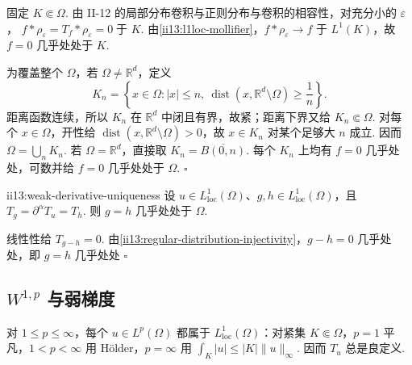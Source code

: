 \begin{FAProof}
固定 \(\displaystyle K\Subset\Omega\). 由 II-12 的局部分布卷积与正则分布与卷积的相容性，对充分小的 \(\displaystyle\varepsilon\)， \(\displaystyle f*\rho_\varepsilon = T_f*\rho_\varepsilon = 0 \;\text{于 }K.\)
由\autoref{ii13:l1loc-mollifier}，\(\displaystyle f*\rho_\varepsilon\to f\) 于 \(\displaystyle L^1(K)\)，故 \(\displaystyle f=0\) 几乎处处于 \(\displaystyle K\).

为覆盖整个 \(\displaystyle\Omega\)，若 \(\displaystyle\Omega\neq\mathbb R^d\)，定义
\[
K_n
=
\left\{x\in\Omega:
|x|\leqslant n,\ 
\operatorname{dist}(x,\mathbb R^d\setminus\Omega)\geqslant\frac1n
\right\}.
\]
距离函数连续，所以 \(\displaystyle K_n\) 在 \(\displaystyle\mathbb R^d\) 中闭且有界，故紧；距离下界又给 \(\displaystyle K_n\Subset\Omega\). 对每个 \(\displaystyle x\in\Omega\)，开性给 \(\displaystyle\operatorname{dist}(x,\mathbb R^d\setminus\Omega)>0\)，故 \(\displaystyle x\in K_n\) 对某个足够大 \(\displaystyle n\) 成立. 因而 \(\displaystyle\Omega=\bigcup_nK_n\). 若 \(\displaystyle\Omega=\mathbb R^d\)，直接取 \(\displaystyle K_n=\overline{B(0,n)}\). 每个 \(\displaystyle K_n\) 上均有 \(\displaystyle f=0\) 几乎处处，可数并给 \(\displaystyle f=0\) 几乎处处于 \(\displaystyle\Omega\).
\hfill\(\square\)
\end{FAProof}

\begin{FACorollary}[B][弱导数代表元唯一性]{ii13:weak-derivative-uniqueness}
设 \(\displaystyle u\in L^1_{\mathrm{loc}}(\Omega)\)、\(\displaystyle g,h\in L^1_{\mathrm{loc}}(\Omega)\)，且 \(\displaystyle T_g=\partial^\alpha T_u=T_h\). 则 \(\displaystyle g=h\) 几乎处处于 \(\displaystyle\Omega\).
\end{FACorollary}

\begin{FAProof}
线性性给 \(\displaystyle T_{g-h}=0\). 由\autoref{ii13:regular-distribution-injectivity}，\(\displaystyle g-h=0\) 几乎处处，即 \(\displaystyle g=h\) 几乎处处
\hfill\(\square\)
\end{FAProof}

\subsection{\texorpdfstring{\(\displaystyle W^{1,p}\)}{W1p} 与弱梯度}

对 \(\displaystyle1\leqslant p\leqslant\infty\)，每个 \(\displaystyle u\in L^p(\Omega)\) 都属于 \(\displaystyle L^1_{\mathrm{loc}}(\Omega)\)：对紧集 \(\displaystyle K\Subset\Omega\)，\(\displaystyle p=1\) 平凡，\(\displaystyle1<p<\infty\) 用 Hölder，\(\displaystyle p=\infty\) 用 \(\displaystyle\int_K|u|\leqslant|K|\|u\|_\infty\). 因而 \(\displaystyle T_u\) 总是良定义.

